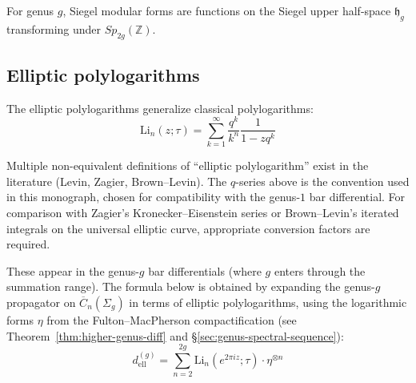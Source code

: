 For genus $g$, Siegel modular forms are functions on the Siegel upper half-space $\mathfrak{h}_g$ transforming under $Sp_{2g}(\mathbb{Z})$.

\subsection{Elliptic polylogarithms}

The elliptic polylogarithms generalize classical polylogarithms:
\[
\text{Li}_n(z;\tau) = \sum_{k=1}^\infty \frac{q^k}{k^n}\frac{1}{1-zq^k}
\]

\begin{remark}[Convention]
Multiple non-equivalent definitions of ``elliptic polylogarithm'' exist in the literature (Levin, Zagier, Brown--Levin). The $q$-series above is the convention used in this monograph, chosen for compatibility with the genus-$1$ bar differential. For comparison with Zagier's Kronecker--Eisenstein series or Brown--Levin's iterated integrals on the universal elliptic curve, appropriate conversion factors are required.
\end{remark}

These appear in the genus-$g$ bar differentials (where $g$ enters through the summation range). The formula below is obtained by expanding the genus-$g$ propagator on $\overline{C}_n(\Sigma_g)$ in terms of elliptic polylogarithms, using the logarithmic forms $\eta$ from the Fulton--MacPherson compactification (see Theorem~\ref{thm:higher-genus-diff} and \S\ref{sec:genus-spectral-sequence}):
\[
d^{(g)}_{\text{ell}} = \sum_{n=2}^{2g} \text{Li}_n(e^{2\pi iz};\tau) \cdot \eta^{\otimes n}
\]
